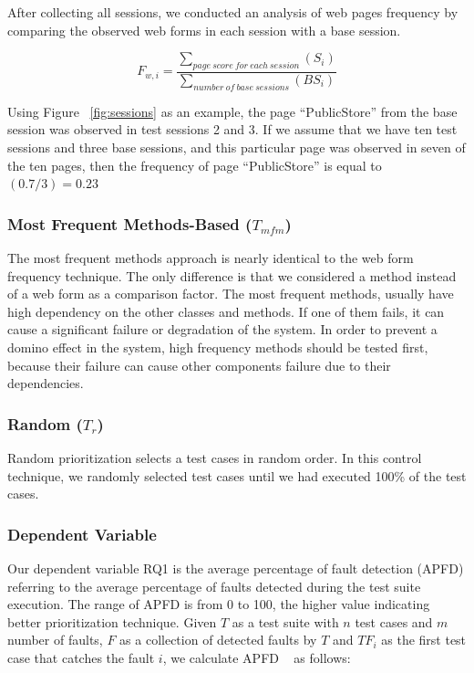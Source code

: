 After collecting all sessions, we conducted an analysis of web pages frequency 
by comparing the observed web forms in each session with a base session. 
	
\[
{F_{w,i} = \frac {\sum_{{page\: score\: for \: each\: session}}(S_{i})}
	{\sum_{{number \: of \: base \: sessions}}({BS_{i}})}}	
\]
	
Using Figure ~\ref{fig:sessions} as an example, the page ``PublicStore'' from the base session 
was observed in test sessions 2 and 3. If we assume that we have 
ten test sessions and three base sessions,
and this particular page was observed in seven of the ten pages, then the
frequency of page ``PublicStore'' is equal to $(0.7 / 3) = 0.23$
	
\subsubsection*{Most Frequent Methods-Based ($T_{mfm}$)}
The most frequent methods approach is nearly identical to the web form frequency technique. 
The only difference is that we considered a method instead of a web form 
as a comparison factor. 
The most frequent methods, usually have high dependency on the other classes and methods. 
If one of them fails, it can cause a significant failure or degradation of the system. 
In order to prevent a domino effect in the system, high frequency methods 
should be tested first, because their failure can cause 
other components failure due to their dependencies.	 	

\subsubsection*{Random ($T_{r}$)}

Random prioritization selects a test cases in random order.
In this control technique, we randomly selected test cases until
we had executed 100\% of the test cases. \\
	
\subsubsection{Dependent Variable} 

Our dependent variable RQ1 is the average percentage of fault detection (APFD)
referring to the average percentage of faults detected during the test suite execution. 
The range of APFD is from 0 to 100, the higher value indicating better prioritization technique. 
Given $T$ as a test suite with $n$ test cases and $m$ number of faults, 
$F$ as a collection of detected faults by $T$ and
$TF_{i}$ as the first test case that catches the fault $i$, 
we calculate APFD ~\cite{apfd} as follows:

